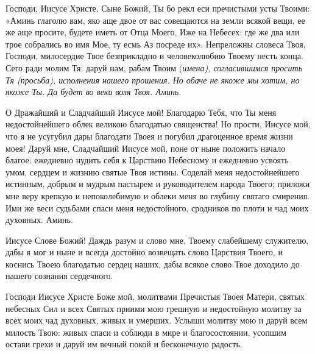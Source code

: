 \nopagebreak\bigskip\bigskip\mychapterending

 


Господи, Иисусе Христе, Сыне Божий, Ты бо рекл еси пречистыми усты Твоими: «Аминь глаголю вам, яко аще двое от вас совещаются на земли всякой вещи, ее же аще просите, будете иметь от Отца Моего, Иже на Небесех: где же два или трое собрались во имя Мое, ту есмь Аз посреде их». Непреложны словеса Твоя, Господи, милосердие Твое безприкладно и человеколюбию Твоему несть конца. Сего ради молим Тя: даруй нам, рабам Твоим (\itshape имена\normalfont{}), согласившимся просить Тя (\itshape просьба\normalfont{}), исполнения нашего прошения. Но обаче не якоже мы хотим, но якоже Ты. Да будет во веки воля Твоя. Аминь.
\nopagebreak\bigskip\bigskip\mychapterending

 



О Дражайший и Сладчайший Иисусе мой! Благодарю Тебя, что Ты меня недостойнейшего облек великою благодатью священства! Но прости, Иисусе мой, что я не усугубил дары благодати Твоея и погубил драгоценное время жизни моея! Даруй мне, Сладчайший Иисусе мой, поне от ныне положить начало благое: ежедневно нудить себя к Царствию Небесному и ежедневно усвоять умом, сердцем и жизнию святые Твоя истины. Соделай меня недостойнейшего истинным, добрым и мудрым пастырем и руководителем народа Твоего; приложи мне веру крепкую и непоколебимую и облеки меня во глубину святаго смирения. Ими же веси судьбами спаси меня недостойного, сродников по плоти и чад моих духовных. Аминь.
\nopagebreak\bigskip\bigskip\mychapterending

 



Иисусе Слове Божий! Даждь разум и слово мне, Твоему слабейшему служителю, дабы я мог и ныне и всегда достойно возвещать слово Царствия Твоего, и коснись Твоею благодатью сердец наших, дабы всякое слово Твое доходило до нашего сознания сердечного.


Господи Иисусе Христе Боже мой, молитвами Пречистыя Твоея Матери, святых небесных Сил и всех Святых приими мою грешную и недостойную молитву за всех моих чад духовных, живых и умерших. Услыши молитву мою и даруй всем милость Твою: живых спаси и соблюди в мире и благосостоянии, усопшим остави грехи и даруй им вечный покой и бесконечную радость.




